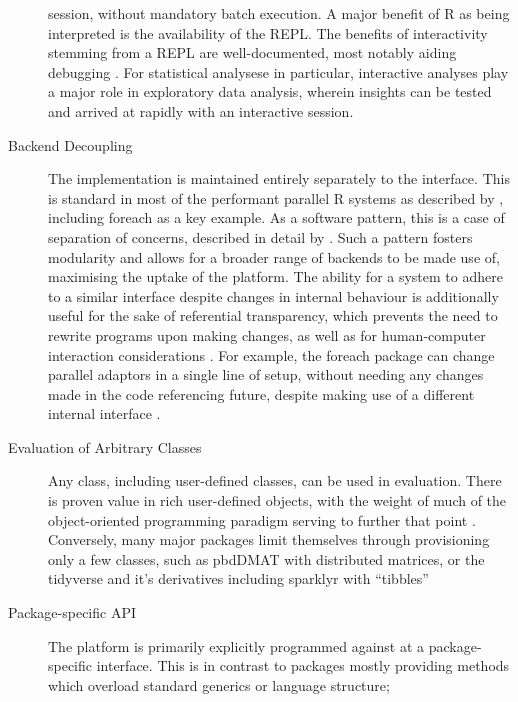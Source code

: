 \documentclass[a4paper,10pt]{article}
\begin{document}
\begin{description}
      session, without mandatory batch execution.
      A major benefit of R as being interpreted is the availability
      of the REPL. The benefits of interactivity stemming from a REPL
      are well-documented, most notably aiding debugging
      \cite{mccarthy1978history}. For statistical analysese in 
      particular, interactive analyses play a major role in 
      exploratory data analysis, wherein insights can be tested
      and arrived at rapidly with an interactive session.
\item[Backend Decoupling]
      The implementation is maintained entirely separately to the
      interface.
      This is standard in most of the performant parallel R systems
      as described by \citeauthor{eddelbuettel2019parallel}, including
      foreach as a key example\cite{microsoft20}.
      As a software pattern, this is a case of separation of
      concerns, described in detail by \cite{dijkstra1982role}.
      Such a pattern fosters modularity and allows for a broader
      range of backends to be made use of, maximising the uptake of
      the platform.
      The ability for a system to adhere to a similar interface despite
	changes in internal behaviour is additionally useful for the sake of
	referential transparency, which prevents the need to rewrite
	programs upon making changes, as well as for human-computer
	interaction considerations \cite{sondergaard1990Rtda}
	\cite{norman2013design}.
      For example, the foreach package can change parallel adaptors in
      a single line of setup, without needing any changes made in the
      code referencing future, despite making use of a different internal
      interface \cite{weston19:_using}.
\item[Evaluation of Arbitrary Classes]
      Any class, including user-defined classes, can be used in
      evaluation.
      There is proven value in rich user-defined objects, with the
      weight of much of the object-oriented programming paradigm
      serving to further that point \cite{dahl2004simula}.
      Conversely, many major packages limit themselves through
      provisioning only a few classes, such as pbdDMAT with
      distributed matrices, or the tidyverse and it's derivatives
      including sparklyr with ``tibbles'' \cite{pbdDMATpackage}
      \cite{wickham2019welcome}
\item[Package-specific API]
      The platform is primarily explicitly programmed against at a
      package-specific interface. 
      This is in contrast to packages mostly providing methods which
      overload standard generics or language structure;

\end{description}
\end{document}
